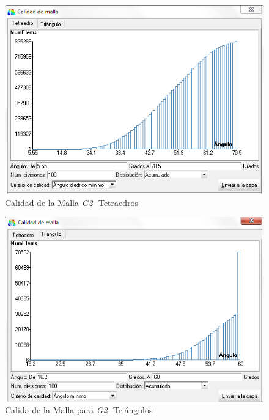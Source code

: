 \documentclass[10pt,a4paper,final]{article}
\begin{document}
\begin{figure}[tbhp]
\centerline{\includegraphics[scale=0.60]{img/200m/200_calidad_malla_tetraedros}}
\caption{Calidad de la Malla \emph{G2}- Tetraedros}
\label{200_calidad_malla_tetraedros}
\end{figure}
%
\begin{figure}[tbhp]
\centerline{\includegraphics[scale=0.60]{img/200m/200_calidad_malla_triangulos}}
\caption{Calida de la Malla para \emph{G2}- Triángulos}
\label{200_calidad_malla_triangulos}
\end{figure}
%
\end{document}
